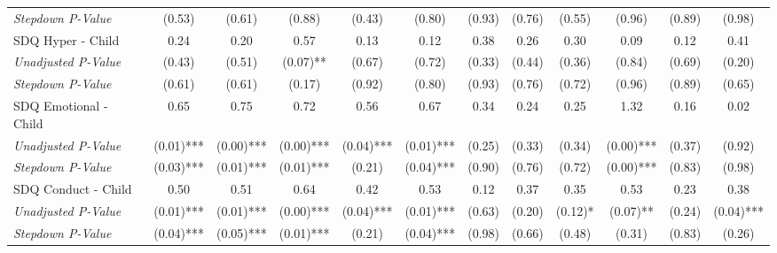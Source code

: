 \begin{tabular}{l c c c c c c c c c c c}
\quad \textit{Stepdown P-Value} & (0.53) & (0.61) & (0.88) & (0.43) & (0.80) & (0.93) & (0.76) & (0.55) & (0.96) & (0.89) & (0.98) \\
SDQ Hyper - Child & 0.24 & 0.20 & 0.57 & 0.13 & 0.12 & 0.38 & 0.26 & 0.30 & 0.09 & 0.12 & 0.41 \\
\quad \textit{Unadjusted P-Value} & (0.43) & (0.51) & (0.07)** & (0.67) & (0.72) & (0.33) & (0.44) & (0.36) & (0.84) & (0.69) & (0.20) \\
\quad \textit{Stepdown P-Value} & (0.61) & (0.61) & (0.17) & (0.92) & (0.80) & (0.93) & (0.76) & (0.72) & (0.96) & (0.89) & (0.65) \\
SDQ Emotional - Child & 0.65 & 0.75 & 0.72 & 0.56 & 0.67 & 0.34 & 0.24 & 0.25 & 1.32 & 0.16 & 0.02 \\
\quad \textit{Unadjusted P-Value} & (0.01)*** & (0.00)*** & (0.00)*** & (0.04)*** & (0.01)*** & (0.25) & (0.33) & (0.34) & (0.00)*** & (0.37) & (0.92) \\
\quad \textit{Stepdown P-Value} & (0.03)*** & (0.01)*** & (0.01)*** & (0.21) & (0.04)*** & (0.90) & (0.76) & (0.72) & (0.00)*** & (0.83) & (0.98) \\
SDQ Conduct - Child & 0.50 & 0.51 & 0.64 & 0.42 & 0.53 & 0.12 & 0.37 & 0.35 & 0.53 & 0.23 & 0.38 \\
\quad \textit{Unadjusted P-Value} & (0.01)*** & (0.01)*** & (0.00)*** & (0.04)*** & (0.01)*** & (0.63) & (0.20) & (0.12)* & (0.07)** & (0.24) & (0.04)*** \\
\quad \textit{Stepdown P-Value} & (0.04)*** & (0.05)*** & (0.01)*** & (0.21) & (0.04)*** & (0.98) & (0.66) & (0.48) & (0.31) & (0.83) & (0.26) \\
\bottomrule
\end{tabular}
